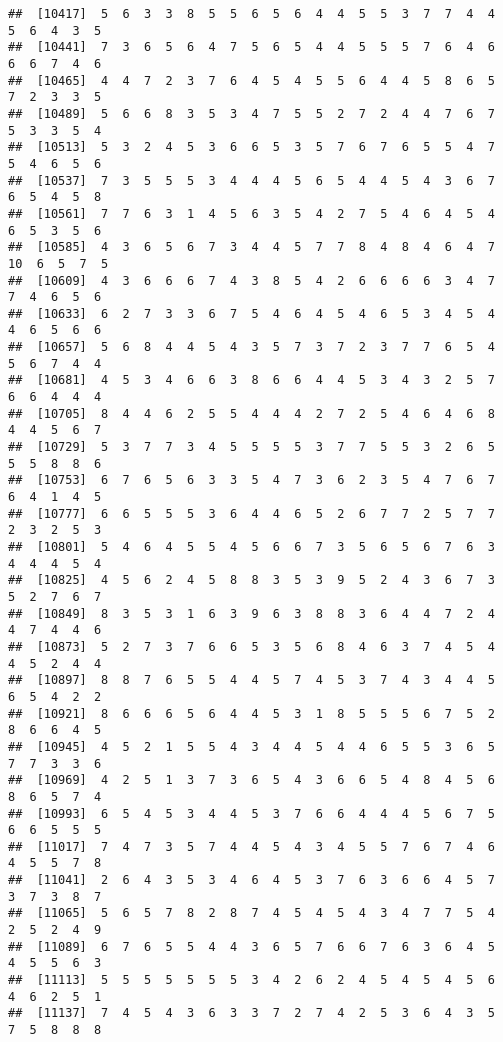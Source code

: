 \documentclass[
]{book}
\begin{document}
\begin{verbatim}
##  [10417]  5  6  3  3  8  5  5  6  5  6  4  4  5  5  3  7  7  4  4  5  6  4  3  5
##  [10441]  7  3  6  5  6  4  7  5  6  5  4  4  5  5  5  7  6  4  6  6  6  7  4  6
##  [10465]  4  4  7  2  3  7  6  4  5  4  5  5  6  4  4  5  8  6  5  7  2  3  3  5
##  [10489]  5  6  6  8  3  5  3  4  7  5  5  2  7  2  4  4  7  6  7  5  3  3  5  4
##  [10513]  5  3  2  4  5  3  6  6  5  3  5  7  6  7  6  5  5  4  7  5  4  6  5  6
##  [10537]  7  3  5  5  5  3  4  4  4  5  6  5  4  4  5  4  3  6  7  6  5  4  5  8
##  [10561]  7  7  6  3  1  4  5  6  3  5  4  2  7  5  4  6  4  5  4  6  5  3  5  6
##  [10585]  4  3  6  5  6  7  3  4  4  5  7  7  8  4  8  4  6  4  7 10  6  5  7  5
##  [10609]  4  3  6  6  6  7  4  3  8  5  4  2  6  6  6  6  3  4  7  7  4  6  5  6
##  [10633]  6  2  7  3  3  6  7  5  4  6  4  5  4  6  5  3  4  5  4  4  6  5  6  6
##  [10657]  5  6  8  4  4  5  4  3  5  7  3  7  2  3  7  7  6  5  4  5  6  7  4  4
##  [10681]  4  5  3  4  6  6  3  8  6  6  4  4  5  3  4  3  2  5  7  6  6  4  4  4
##  [10705]  8  4  4  6  2  5  5  4  4  4  2  7  2  5  4  6  4  6  8  4  4  5  6  7
##  [10729]  5  3  7  7  3  4  5  5  5  5  3  7  7  5  5  3  2  6  5  5  5  8  8  6
##  [10753]  6  7  6  5  6  3  3  5  4  7  3  6  2  3  5  4  7  6  7  6  4  1  4  5
##  [10777]  6  6  5  5  5  3  6  4  4  6  5  2  6  7  7  2  5  7  7  2  3  2  5  3
##  [10801]  5  4  6  4  5  5  4  5  6  6  7  3  5  6  5  6  7  6  3  4  4  4  5  4
##  [10825]  4  5  6  2  4  5  8  8  3  5  3  9  5  2  4  3  6  7  3  5  2  7  6  7
##  [10849]  8  3  5  3  1  6  3  9  6  3  8  8  3  6  4  4  7  2  4  4  7  4  4  6
##  [10873]  5  2  7  3  7  6  6  5  3  5  6  8  4  6  3  7  4  5  4  4  5  2  4  4
##  [10897]  8  8  7  6  5  5  4  4  5  7  4  5  3  7  4  3  4  4  5  6  5  4  2  2
##  [10921]  8  6  6  6  5  6  4  4  5  3  1  8  5  5  5  6  7  5  2  8  6  6  4  5
##  [10945]  4  5  2  1  5  5  4  3  4  4  5  4  4  6  5  5  3  6  5  7  7  3  3  6
##  [10969]  4  2  5  1  3  7  3  6  5  4  3  6  6  5  4  8  4  5  6  8  6  5  7  4
##  [10993]  6  5  4  5  3  4  4  5  3  7  6  6  4  4  4  5  6  7  5  6  6  5  5  5
##  [11017]  7  4  7  3  5  7  4  4  5  4  3  4  5  5  7  6  7  4  6  4  5  5  7  8
##  [11041]  2  6  4  3  5  3  4  6  4  5  3  7  6  3  6  6  4  5  7  3  7  3  8  7
##  [11065]  5  6  5  7  8  2  8  7  4  5  4  5  4  3  4  7  7  5  4  2  5  2  4  9
##  [11089]  6  7  6  5  5  4  4  3  6  5  7  6  6  7  6  3  6  4  5  4  5  5  6  3
##  [11113]  5  5  5  5  5  5  5  3  4  2  6  2  4  5  4  5  4  5  6  4  6  2  5  1
##  [11137]  7  4  5  4  3  6  3  3  7  2  7  4  2  5  3  6  4  3  5  7  5  8  8  8

\end{verbatim}
\end{document}
